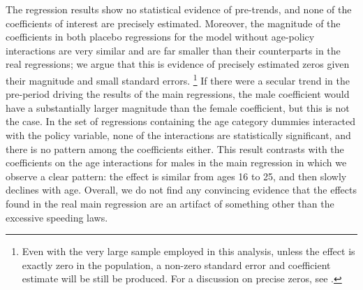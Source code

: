 \documentclass{cje}
\begin{document}
The regression results show no statistical evidence of pre-trends, 
and none of the coefficients of interest are precisely estimated. 
Moreover, the magnitude of the coefficients in both placebo regressions 
for the model without age-policy interactions are very similar 
and are far smaller than their counterparts in the real regressions; 
we argue that this is evidence of precisely estimated zeros 
given their magnitude and small standard errors.%
\footnote{%
Even with the very large sample employed in this analysis, 
unless the effect is exactly zero in the population, 
a non-zero standard error and coefficient estimate will be still be produced. 
For a discussion on precise zeros, see 
\citet{penney2013}. 
}
%
If there were a secular trend in the pre-period driving the results of the main regressions, 
the male coefficient would have a substantially larger magnitude than the female coefficient, 
but this is not the case. 
In the set of regressions containing the age category dummies interacted with the policy variable, 
none of the interactions are statistically significant, and there is no pattern among the coefficients either.
This result contrasts with the coefficients on the age interactions for males 
in the main regression in which we observe a clear pattern: 
the effect is similar from ages 16 to 25, and then slowly declines with age. 
Overall, we do not find any convincing evidence that the effects found in the 
real main regression are an artifact of something other than the excessive speeding laws.
\end{document}
